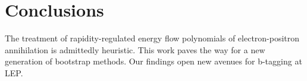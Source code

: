 \section{Conclusions}\label{sec:conclusions}

The treatment of rapidity-regulated energy flow polynomials of
electron-positron annihilation is admittedly heuristic. This work paves
the way for a new generation of bootstrap methods. Our findings open new
avenues for b-tagging at LEP.

